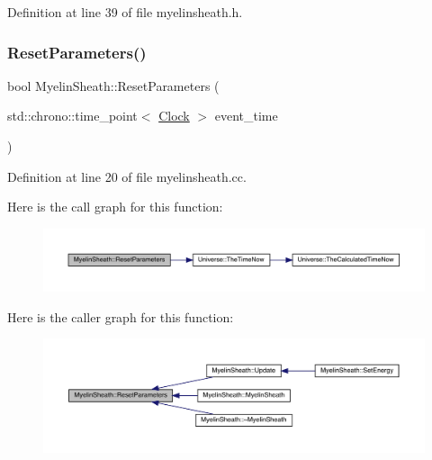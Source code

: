 Definition at line 39 of file myelinsheath.\+h.

\mbox{\label{class_myelin_sheath_af1174b93be36aa43506a4ba9857d92a4}} 
\subsubsection{\texorpdfstring{Reset\+Parameters()}{ResetParameters()}}
{\footnotesize\ttfamily bool Myelin\+Sheath\+::\+Reset\+Parameters (\begin{DoxyParamCaption}\item[{std\+::chrono\+::time\+\_\+point$<$ \hyperlink{universe_8h_a0ef8d951d1ca5ab3cfaf7ab4c7a6fd80}{Clock} $>$}]{event\+\_\+time }\end{DoxyParamCaption})}



Definition at line 20 of file myelinsheath.\+cc.

Here is the call graph for this function\+:\nopagebreak
\begin{figure}[H]
\begin{center}
\leavevmode
\includegraphics[width=350pt]{class_myelin_sheath_af1174b93be36aa43506a4ba9857d92a4_cgraph}
\end{center}
\end{figure}
Here is the caller graph for this function\+:
\nopagebreak
\begin{figure}[H]
\begin{center}
\leavevmode
\includegraphics[width=350pt]{class_myelin_sheath_af1174b93be36aa43506a4ba9857d92a4_icgraph}
\end{center}
\end{figure}
\mbox{\label{class_myelin_sheath_afb9cd377a71881558f48cf8bb226af77}} 
